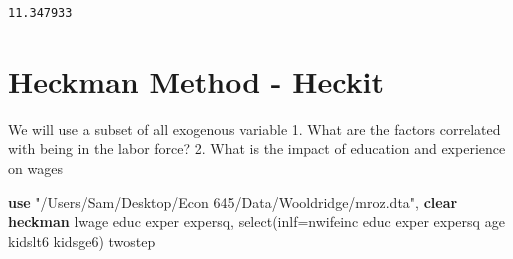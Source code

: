 \documentclass[
]{book}
\newenvironment{Shaded}{\begin{snugshade}}{\end{snugshade}}
\newcommand{\KeywordTok}[1]{\textcolor[rgb]{0.13,0.29,0.53}{\textbf{#1}}}
\newcommand{\NormalTok}[1]{#1}
\newcommand{\StringTok}[1]{\textcolor[rgb]{0.31,0.60,0.02}{#1}}
\begin{document}
\begin{verbatim}
11.347933
\end{verbatim}

\section{Heckman Method - Heckit}\label{heckman-method---heckit}

We will use a subset of all exogenous variable
1. What are the factors correlated with being in the labor force?
2. What is the impact of education and experience on wages

\begin{Shaded}
\begin{Highlighting}[]
\KeywordTok{use} \StringTok{"/Users/Sam/Desktop/Econ 645/Data/Wooldridge/mroz.dta"}\NormalTok{, }\KeywordTok{clear}
\KeywordTok{heckman}\NormalTok{ lwage educ exper expersq, select(inlf=nwifeinc educ exper expersq age kidslt6 kidsge6) twostep }
\end{Highlighting}
\end{Shaded}
\end{document}
